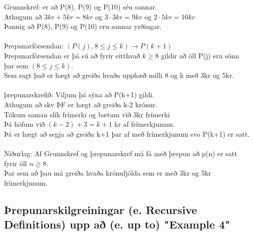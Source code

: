 Grunnskref: er að P(8), P(9) og P(10) séu sannar.\\
\indent Athugum að $3kr + 5kr = 8kr$ og $3 \cdot 3kr = 9kr$ og $2 \cdot 5kr = 10kr$\\
\indent Þannig að P(8), P(9) og P(10) eru sannar yrðingar.\\
\\
\indent Þrepunarförsendan: $(P(j), 8\leq j \leq k) \rightarrow P(k+1)$ \\
\indent Þrepunarförsendan er þá sú að fyrir eitthvað $k \geq 8$ gildir að öll P(j) eru sönn \\ 
\indent þar sem $(8\leq j \leq k)$. \\
\indent Sem sagt það er hægt að greiða hvaða upphæð milli 8 og k með 3kr og 5kr.\\
\\
\indent þrepunarskrefið: Viljum þá sýna að P(k+1) gildi.\\
\indent Athugum að skv ÞF er hægt að greiða k-2 krónur.\\
\indent Tökum saman slík frímerki og bætum við 3kr frímerki\\
\indent Þá höfum við $(k-2) + 3 = k + 1$ kr af frímerkjunum.\\
\indent Þá er hægt að segja að greiða k+1 þar af með frímerkjunum svo P(k+1) er satt.\\
\\
\indent Niðurlag: Af Grunnskref og þrepunarskref má fá með þrepun að p(n) er satt\\ 
\indent fyrir öll $n \geq 8$.\\
\indent Þar sem að þau má greiða hvaða krónufjölda sem er með 3kr og 5kr frímerkjunum.

\newpage
\subsection{Þrepunarskilgreiningar  (e. Recursive Definitions) upp að (e. up to) "Example 4"}
\newpage